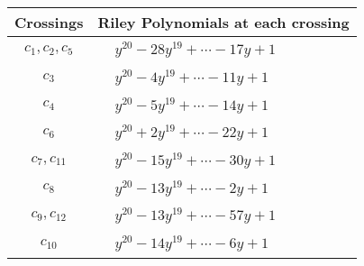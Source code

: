 \documentclass[1p]{elsarticle_modified}
\theoremstyle{definition}
\begin{document}
\begin{tabular}{m{50pt}|m{274pt}}
Crossings & \hspace{64pt}Riley Polynomials at each crossing \\
\hline $$\begin{aligned}c_{1},c_{2},c_{5}\end{aligned}$$&$\begin{aligned}
&y^{20}-28 y^{19}+\cdots-17 y+1
\end{aligned}$\\
\hline $$\begin{aligned}c_{3}\end{aligned}$$&$\begin{aligned}
&y^{20}-4 y^{19}+\cdots-11 y+1
\end{aligned}$\\
\hline $$\begin{aligned}c_{4}\end{aligned}$$&$\begin{aligned}
&y^{20}-5 y^{19}+\cdots-14 y+1
\end{aligned}$\\
\hline $$\begin{aligned}c_{6}\end{aligned}$$&$\begin{aligned}
&y^{20}+2 y^{19}+\cdots-22 y+1
\end{aligned}$\\
\hline $$\begin{aligned}c_{7},c_{11}\end{aligned}$$&$\begin{aligned}
&y^{20}-15 y^{19}+\cdots-30 y+1
\end{aligned}$\\
\hline $$\begin{aligned}c_{8}\end{aligned}$$&$\begin{aligned}
&y^{20}-13 y^{19}+\cdots-2 y+1
\end{aligned}$\\
\hline $$\begin{aligned}c_{9},c_{12}\end{aligned}$$&$\begin{aligned}
&y^{20}-13 y^{19}+\cdots-57 y+1
\end{aligned}$\\
\hline $$\begin{aligned}c_{10}\end{aligned}$$&$\begin{aligned}
&y^{20}-14 y^{19}+\cdots-6 y+1
\end{aligned}$\\
\hline
\end{tabular}\\~\\
\end{document}
